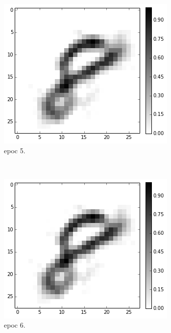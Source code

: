 \begin{figure}[hbt]
		\begin{subfigure}[t]{0.18\textwidth}
			\includegraphics[width=\textwidth]{pics_sdbn/b10_epoc5.png}
			\caption{epoc 5.}
		\end{subfigure}\\
		\begin{subfigure}[t]{0.18\textwidth}
			\includegraphics[width=\textwidth]{pics_sdbn/b10_epoc6.png}
			\caption{epoc 6.}
		\end{subfigure}
		\begin{subfigure}[t]{0.18\textwidth}

\end{subfigure}
\end{figure}
